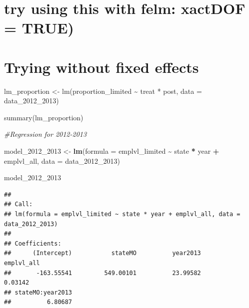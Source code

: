 \documentclass[
]{article}
\newenvironment{Shaded}{\begin{snugshade}}{\end{snugshade}}
\newcommand{\AttributeTok}[1]{\textcolor[rgb]{0.13,0.29,0.53}{#1}}
\newcommand{\CommentTok}[1]{\textcolor[rgb]{0.56,0.35,0.01}{\textit{#1}}}
\newcommand{\FunctionTok}[1]{\textcolor[rgb]{0.13,0.29,0.53}{\textbf{#1}}}
\newcommand{\NormalTok}[1]{#1}
\newcommand{\OtherTok}[1]{\textcolor[rgb]{0.56,0.35,0.01}{#1}}
\newcommand{\SpecialCharTok}[1]{\textcolor[rgb]{0.81,0.36,0.00}{\textbf{#1}}}
\begin{document}
\hypertarget{try-using-this-with-felm-xactdof-true}{%
\section{try using this with felm: xactDOF =
TRUE)}\label{try-using-this-with-felm-xactdof-true}}

\hypertarget{trying-without-fixed-effects}{%
\section{Trying without fixed
effects}\label{trying-without-fixed-effects}}

lm\_proportion \textless- lm(proportion\_limited \textasciitilde{} treat
* post, data = data\_2012\_2013)

summary(lm\_proportion)

\begin{Shaded}
\begin{Highlighting}[]
\CommentTok{\#Regression for 2012{-}2013}

\NormalTok{model\_2012\_2013 }\OtherTok{\textless{}{-}} \FunctionTok{lm}\NormalTok{(}\AttributeTok{formula =}\NormalTok{ emplvl\_limited }\SpecialCharTok{\textasciitilde{}}\NormalTok{ state }\SpecialCharTok{*}\NormalTok{ year }\SpecialCharTok{+}\NormalTok{ emplvl\_all,}
   \AttributeTok{data =}\NormalTok{ data\_2012\_2013) }

\NormalTok{model\_2012\_2013}
\end{Highlighting}
\end{Shaded}

\begin{verbatim}
## 
## Call:
## lm(formula = emplvl_limited ~ state * year + emplvl_all, data = data_2012_2013)
## 
## Coefficients:
##      (Intercept)           stateMO          year2013        emplvl_all  
##       -163.55541         549.00101          23.99582           0.03142  
## stateMO:year2013  
##          6.80687
\end{verbatim}
\end{document}

